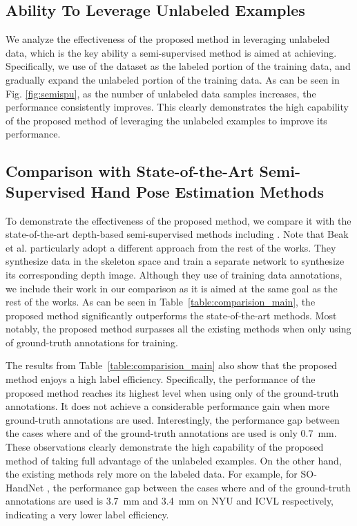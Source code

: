 \documentclass{article}
\begin{document}
\subsection{Ability To Leverage Unlabeled Examples}
We analyze the effectiveness of the proposed method in leveraging unlabeled data, which is the key ability a semi-supervised method is aimed at achieving. Specifically, we use  of the dataset as the labeled portion of the training data, and gradually expand the unlabeled portion of the training data. As can be seen in Fig. \ref{fig:semispu}, as the number of unlabeled data samples increases, the performance consistently improves. This clearly demonstrates the high capability of the proposed method of leveraging the unlabeled examples to improve its performance. 

\subsection{Comparison with State-of-the-Art Semi-Supervised Hand Pose Estimation Methods}
To demonstrate the effectiveness of the proposed method, we compare it with the state-of-the-art depth-based semi-supervised methods including \cite{chen2019so,wan2017crossing,baek2018augmented,abdi20183d}. Note that Beak et al. \cite{baek2018augmented} particularly adopt a different approach from the rest of the works. They synthesize data in the skeleton space and train a separate network to synthesize its corresponding depth image. Although they use  of training data annotations, we include their work in our comparison as it is aimed at the same goal as the rest of the works. As can be seen in Table~\ref{table:comparision_main}, the proposed method significantly outperforms the state-of-the-art methods. Most notably, the proposed method surpasses all the existing methods when only using  of ground-truth annotations for training. 
\par
The results from Table~\ref{table:comparision_main} also show that the proposed method enjoys a high label efficiency. Specifically, the performance of the proposed method reaches its highest level when using only  of the ground-truth annotations. It does not achieve a considerable performance gain when more ground-truth annotations are used. Interestingly, the performance gap between the cases where  and  of the ground-truth annotations are used is only 0.7~mm. These observations clearly demonstrate the high capability of the proposed method of taking full advantage of the unlabeled examples. On the other hand, the existing methods rely more on the labeled data. For example, for SO-HandNet \cite{chen2019so}, the performance gap between the cases where  and  of the ground-truth annotations are used is 3.7~mm and 3.4~mm on NYU and ICVL respectively, indicating a very lower label efficiency.
\end{document}
